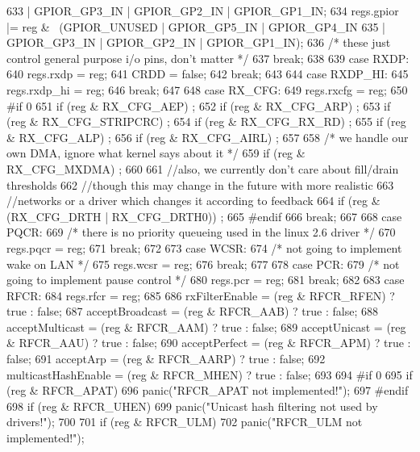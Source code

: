 \begin{DoxyCode}
{{{633                         | GPIOR_GP3_IN | GPIOR_GP2_IN | GPIOR_GP1_IN;
634             regs.gpior |= reg & ~(GPIOR_UNUSED | GPIOR_GP5_IN | GPIOR_GP4_IN
635                                 | GPIOR_GP3_IN | GPIOR_GP2_IN | GPIOR_GP1_IN);
636             /* these just control general purpose i/o pins, don't matter */
637             break;
638 
639           case RXDP:
640             regs.rxdp = reg;
641             CRDD = false;
642             break;
643 
644           case RXDP_HI:
645             regs.rxdp_hi = reg;
646             break;
647 
648           case RX_CFG:
649             regs.rxcfg = reg;
650 #if 0
651             if (reg & RX_CFG_AEP) ;
652             if (reg & RX_CFG_ARP) ;
653             if (reg & RX_CFG_STRIPCRC) ;
654             if (reg & RX_CFG_RX_RD) ;
655             if (reg & RX_CFG_ALP) ;
656             if (reg & RX_CFG_AIRL) ;
657 
658             /* we handle our own DMA, ignore what kernel says about it */
659             if (reg & RX_CFG_MXDMA) ;
660 
661             //also, we currently don't care about fill/drain thresholds
662             //though this may change in the future with more realistic
663             //networks or a driver which changes it according to feedback
664             if (reg & (RX_CFG_DRTH | RX_CFG_DRTH0)) ;
665 #endif
666             break;
667 
668           case PQCR:
669             /* there is no priority queueing used in the linux 2.6 driver */
670             regs.pqcr = reg;
671             break;
672 
673           case WCSR:
674             /* not going to implement wake on LAN */
675             regs.wcsr = reg;
676             break;
677 
678           case PCR:
679             /* not going to implement pause control */
680             regs.pcr = reg;
681             break;
682 
683           case RFCR:
684             regs.rfcr = reg;
685 
686             rxFilterEnable = (reg & RFCR_RFEN) ? true : false;
687             acceptBroadcast = (reg & RFCR_AAB) ? true : false;
688             acceptMulticast = (reg & RFCR_AAM) ? true : false;
689             acceptUnicast = (reg & RFCR_AAU) ? true : false;
690             acceptPerfect = (reg & RFCR_APM) ? true : false;
691             acceptArp = (reg & RFCR_AARP) ? true : false;
692             multicastHashEnable = (reg & RFCR_MHEN) ? true : false;
693 
694 #if 0
695             if (reg & RFCR_APAT)
696                 panic("RFCR_APAT not implemented!\n");
697 #endif
698             if (reg & RFCR_UHEN)
699                 panic("Unicast hash filtering not used by drivers!\n");
700 
701             if (reg & RFCR_ULM)
702                 panic("RFCR_ULM not implemented!\n");
}}}
\end{DoxyCode}

